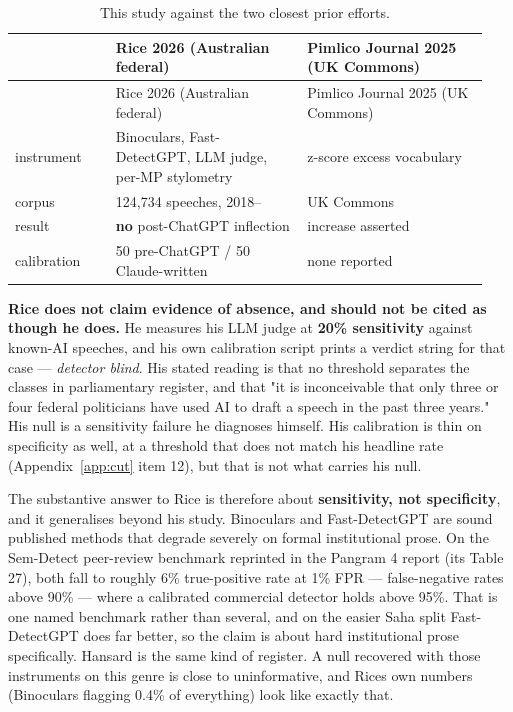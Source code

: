 \begingroup\small
\begin{longtable}[]{@{}p{0.20\linewidth}p{0.38\linewidth}p{0.36\linewidth}@{}}
\caption{This study against the two closest prior efforts.}\label{tab:priorart}\\
\toprule\noalign{}
& Rice 2026 (Australian federal) & Pimlico Journal 2025 (UK Commons) \\
\midrule\noalign{}
\endfirsthead
\toprule\noalign{}
& Rice 2026 (Australian federal) & Pimlico Journal 2025 (UK Commons) \\
\midrule\noalign{}
\endhead
\bottomrule\noalign{}
\endlastfoot
instrument & Binoculars, Fast-DetectGPT, LLM judge, per-MP stylometry & z-score excess vocabulary \\
corpus & 124,734 speeches, 2018-- & UK Commons \\
result & \textbf{no} post-ChatGPT inflection & increase asserted \\
calibration & 50 pre-ChatGPT / 50 Claude-written & none reported \\
\end{longtable}
\endgroup

\textbf{Rice\cite{rice2026} does not claim evidence of absence, and should not be cited as
though he does.} He measures his LLM judge at \textbf{20\% sensitivity} against
known-AI speeches, and his own calibration script prints a verdict string for
that case --- \emph{detector blind}. His stated reading is that no threshold
separates the classes in parliamentary register, and that
"it is inconceivable that only three or four federal politicians have used AI
to draft a speech in the past three years." His null is a sensitivity failure
he diagnoses himself. His calibration is thin on specificity as well, at a
threshold that does not match his headline rate (Appendix~\ref{app:cut} item 12), but that
is not what carries his null.

The substantive answer to Rice is therefore about \textbf{sensitivity, not
specificity}, and it generalises beyond his study. Binoculars\cite{hans2024} and Fast-DetectGPT\cite{bao2024} are sound published methods that
degrade severely on formal institutional prose. On the Sem-Detect peer-review
benchmark reprinted in the Pangram 4 report (its Table 27), both fall to
roughly 6\% true-positive rate at 1\% FPR --- false-negative rates above 90\% ---
where a calibrated commercial detector holds above 95\%. That is one named
benchmark rather than several, and on the easier Saha split Fast-DetectGPT does
far better, so the claim is about hard institutional prose specifically.
Hansard is the same kind of register. A null recovered with those instruments
on this genre is close to uninformative, and Rice\textquotesingle s own numbers (Binoculars
flagging 0.4\% of everything) look like exactly that.

